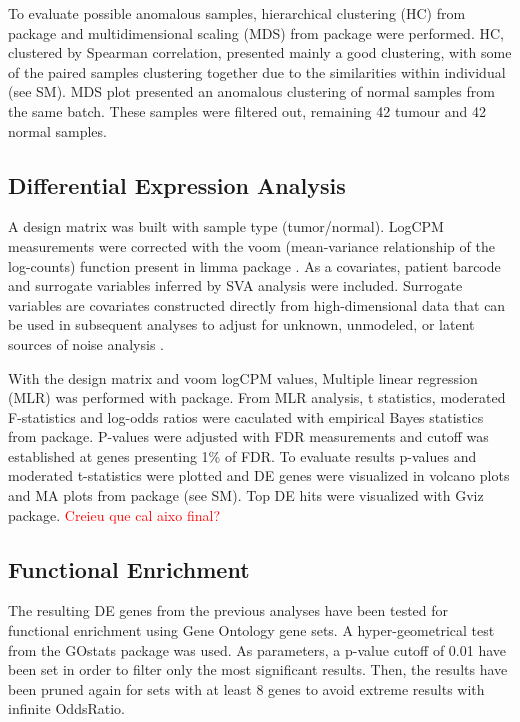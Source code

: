 \documentclass[9pt,twocolumn,twoside]{gsajnl}
\begin{document}
To evaluate possible anomalous samples, hierarchical clustering (HC) from \cite{pheatmap} package and multidimensional scaling (MDS) from \cite{limma} package were performed. HC, clustered by Spearman correlation, presented mainly a good clustering, with some of the paired samples clustering together due to the similarities within individual (see SM). MDS plot presented an anomalous clustering of normal samples from the same batch. These samples were filtered out, remaining 42 tumour and 42 normal samples.



\subsection*{Differential Expression Analysis}

A design matrix was built with sample type (tumor/normal). LogCPM measurements were corrected with the  voom (mean-variance relationship of the log-counts) function present in limma package \cite{voom}. As a covariates,  patient barcode and surrogate variables inferred by SVA analysis were included. Surrogate variables are covariates constructed directly from high-dimensional data that can be used in subsequent analyses to adjust for unknown, unmodeled, or latent sources of noise analysis \cite{GSVA}.

With the design matrix and voom logCPM values, Multiple linear regression (MLR) was performed with \cite{limma} package. From MLR analysis, t statistics, moderated F-statistics and  log-odds ratios were caculated with empirical Bayes statistics from \cite{limma} package. P-values were adjusted with FDR measurements and cutoff was established at genes presenting 1\% of FDR. To evaluate results p-values and moderated t-statistics were plotted and DE genes were visualized in volcano plots and  MA plots  from \cite{limma} package (see SM). Top DE hits were visualized with Gviz package. \textcolor{red}{Creieu que cal aixo final?}


\subsection*{Functional Enrichment}


The resulting DE genes from the previous analyses have been tested for functional enrichment using Gene Ontology gene sets. A hyper-geometrical test from the GOstats package \cite{GOstats} was used. As parameters, a p-value cutoff of 0.01 have been set in order to filter only the most significant results. Then, the results have been pruned again for sets with at least 8 genes to avoid extreme results with infinite OddsRatio.
\end{document}
